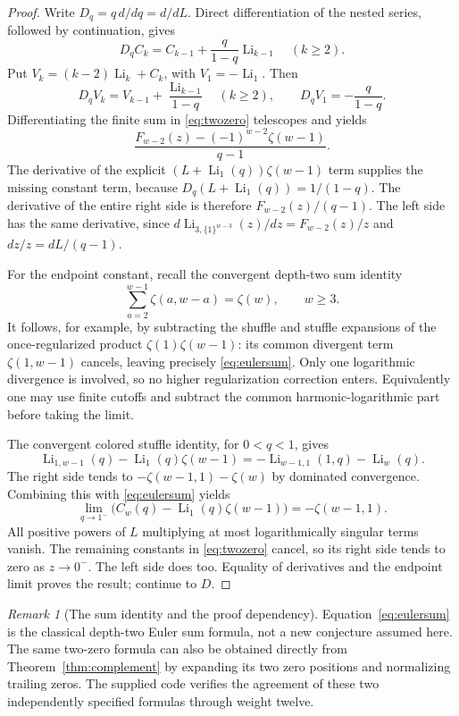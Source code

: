 \documentclass[11pt]{article}
\numberwithin{equation}{section}
\theoremstyle{definition}\newtheorem{definition}[theorem]{Definition}
\theoremstyle{remark}\newtheorem{remark}[theorem]{Remark}
\DeclareMathOperator{\Li}{Li}
\newcommand{\ones}[1]{\{1\}^{#1}}
\begin{document}
\begin{proof}
Write $D_q=q\,d/dq=d/dL$. Direct differentiation of the nested series,
followed by continuation, gives
\[
 D_qC_k=C_{k-1}+\frac{q}{1-q}\Li_{k-1}\quad(k\ge2).
\]
Put $V_k=(k-2)\Li_k+C_k$, with $V_1=-\Li_1$.
Then
\[
 D_qV_k=V_{k-1}+\frac{\Li_{k-1}}{1-q}\quad(k\ge2),
 \qquad D_qV_1=-\frac{q}{1-q}.
\]
Differentiating the finite sum in \eqref{eq:twozero} telescopes and yields
\[
 \frac{F_{w-2}(z)-(-1)^{w-2}\zeta(w-1)}{q-1}.
\]
The derivative of the explicit $(L+\Li_1(q))\zeta(w-1)$ term supplies
the missing constant term, because
$D_q(L+\Li_1(q))=1/(1-q)$.
The derivative of the entire right side is therefore
$F_{w-2}(z)/(q-1)$.
The left side has the same derivative, since
$d\Li_{3,\ones{w-3}}(z)/dz=F_{w-2}(z)/z$ and
$dz/z=dL/(q-1)$.

For the endpoint constant, recall the convergent depth-two sum identity
\begin{equation}\label{eq:eulersum}
 \sum_{a=2}^{w-1}\zeta(a,w-a)=\zeta(w),\qquad w\ge3.
\end{equation}
It follows, for example, by subtracting the shuffle and stuffle
expansions of the once-regularized product $\zeta(1)\zeta(w-1)$:
its common divergent term $\zeta(1,w-1)$ cancels, leaving precisely
\eqref{eq:eulersum}. Only one logarithmic divergence is involved, so
no higher regularization correction enters. Equivalently one may use
finite cutoffs and subtract the common harmonic-logarithmic part
before taking the limit.

The convergent colored stuffle identity, for $0<q<1$, gives
\[
 \Li_{1,w-1}(q)-\Li_1(q)\zeta(w-1)
 =-\Li_{w-1,1}(1,q)-\Li_w(q).
\]
The right side tends to $-\zeta(w-1,1)-\zeta(w)$ by dominated
convergence. Combining this with \eqref{eq:eulersum} yields
\[
 \lim_{q\to1^-}\bigl(C_w(q)-\Li_1(q)\zeta(w-1)\bigr)
 =-\zeta(w-1,1).
\]
All positive powers of $L$ multiplying at most logarithmically singular
terms vanish. The remaining constants in \eqref{eq:twozero} cancel,
so its right side tends to zero as $z\to0^-$. The left side does too.
Equality of derivatives and the endpoint limit proves the result;
continue to $D$.
\end{proof}

\begin{remark}[The sum identity and the proof dependency]
Equation~\eqref{eq:eulersum} is the classical depth-two Euler sum
formula, not a new conjecture assumed here. The same two-zero formula
can also be obtained directly from Theorem~\ref{thm:complement} by
expanding its two zero positions and normalizing trailing zeros.
The supplied code verifies the agreement of these two independently
specified formulas through weight twelve.
\end{remark}
\end{document}
